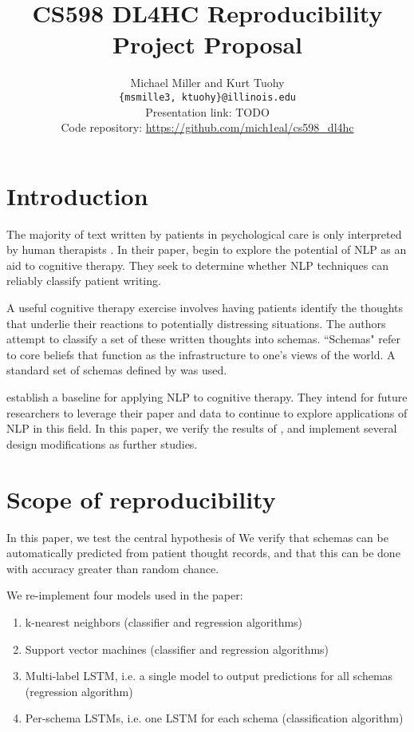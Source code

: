 \documentclass[11pt,a4paper]{article}
\title{CS598 DL4HC Reproducibility Project Proposal}
\author{Michael Miller and Kurt Tuohy\\
  \texttt{\{msmille3, ktuohy\}@illinois.edu}
  \\[2em]
  Presentation link: TODO\url{} \\
  Code repository: \url{https://github.com/mich1eal/cs598_dl4hc} \citep{cs598_repo}}
\begin{document}
\maketitle


\section{Introduction}

The majority of text written by patients in psychological care is only interpreted by human therapists \citep{burger_2021}. In their paper, \citeauthor{burger_2021} begin to explore the potential of NLP as an aid to cognitive therapy. They seek to determine whether NLP techniques can reliably classify patient writing.

A useful cognitive therapy exercise involves having patients identify the thoughts that underlie their reactions to potentially distressing situations. The authors attempt to classify a set of these written thoughts into schemas. ``Schemas" refer to core beliefs that function as the infrastructure to one's views of the world. A standard set of schemas defined by \citeauthor{millings_2015} was used.

\citeauthor{burger_2021} establish a baseline for applying NLP to cognitive therapy. They intend for future researchers to leverage their paper and data to continue to explore applications of NLP in this field. In this paper, we verify the results of \citeauthor{burger_2021}, and implement several design modifications as further studies. 

\section{Scope of reproducibility}

In this paper, we test the central hypothesis of \citeauthor{burger_2021} We verify that schemas can be automatically predicted from patient thought records, and that this can be done with accuracy greater than random chance.

We re-implement four models used in the paper:
\begin{enumerate}
    \item k-nearest neighbors (classifier and regression algorithms)
    \item Support vector machines (classifier and regression algorithms)
    \item Multi-label LSTM, i.e. a single model to output predictions for all schemas (regression algorithm)
    \item Per-schema LSTMs, i.e. one LSTM for each schema (classification algorithm)
\end{enumerate}
\end{document}

